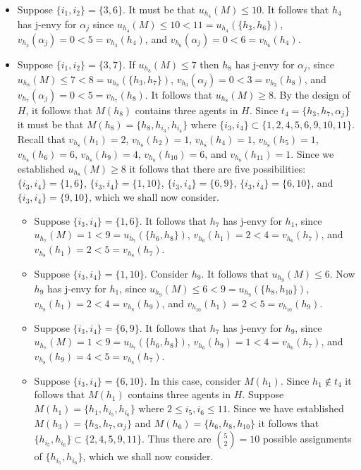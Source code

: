 \begin{itemize}
\begin{itemize}
\end{itemize}
\item Suppose $\{ {i_1}, {i_2} \} = \{ 3, 6 \}$. It must be that $u_{h_4}(M) \leq 10$. It follows that $h_4$ has j-envy for $\alpha_{j}$ since $u_{h_4}(M) \leq 10 < 11 = u_{h_4}(\{ h_3, h_6 \})$, $v_{h_3}(\alpha_{j}) = 0 < 5 = v_{h_3}(h_4)$, and $v_{h_6}(\alpha_{j}) = 0 < 6 = v_{h_6}(h_4)$.
\item Suppose $\{ {i_1}, {i_2} \} = \{ 3, 7 \}$. If $u_{h_8}(M) \leq 7$ then $h_8$ has j-envy for $\alpha_{j}$, since $u_{h_8}(M) \leq 7 < 8 = u_{h_8}(\{ h_3, h_7 \})$, $v_{h_3}(\alpha_{j}) = 0 < 3 = v_{h_3}(h_8)$, and $v_{h_7}(\alpha_{j}) = 0 < 5 = v_{h_7}(h_8)$. It follows that $u_{h_8}(M) \geq 8$. By the design of $H$, it follows that $M(h_8)$ contains three agents in $H$. Since $t_4 = \{ h_3, h_7, \alpha_{j} \}$ it must be that $M(h_8) = \{ h_8, h_{i_3}, h_{i_4} \}$ where $\{ i_3, i_4 \} \subset \{ 1, 2, 4, 5, 6, 9, 10, 11 \}$. Recall that $v_{h_8}(h_1) = 2$, $v_{h_8}(h_2) = 1$, $v_{h_8}(h_4) = 1$, $v_{h_8}(h_5) = 1$, $v_{h_8}(h_6) = 6$, $v_{h_8}(h_9) = 4$, $v_{h_8}(h_{10}) = 6$, and $v_{h_8}(h_{11}) = 1$. Since we established $u_{h_8}(M) \geq 8$ it follows that there are five possibilities: $\{ {i_3}, {i_4} \} = \{ 1, 6 \}$, $\{ {i_3}, {i_4} \} = \{ 1, 10 \}$, $\{ {i_3}, {i_4} \} = \{ 6, 9 \}$, $\{ {i_3}, {i_4} \} = \{ 6, 10 \}$, and $\{ {i_3}, {i_4} \} = \{ 9, 10 \}$, which we shall now consider.
\begin{itemize}
    \item Suppose $\{ {i_3}, {i_4} \} = \{ 1, 6 \}$. It follows that $h_7$ has j-envy for $h_1$, since $u_{h_7}(M) = 1 < 9 = u_{h_7}(\{ h_6, h_8 \})$, $v_{h_6}(h_1) = 2 < 4 = v_{h_6}(h_7)$, and $v_{h_8}(h_1) = 2 < 5 = v_{h_8}(h_7)$.
    \item Suppose $\{ {i_3}, {i_4} \} = \{ 1, 10 \}$. Consider $h_9$. It follows that $u_{h_9}(M) \leq 6$. Now $h_9$ has j-envy for $h_1$, since $u_{h_9}(M) \leq 6 < 9 = u_{h_9}(\{ h_8, h_{10} \})$, $v_{h_8}(h_1) = 2 < 4 = v_{h_8}(h_9)$, and $v_{h_{10}}(h_1) = 2 < 5 = v_{h_{10}}(h_9)$.
    \item Suppose $\{ {i_3}, {i_4} \} = \{ 6, 9 \}$. It follows that $h_7$ has j-envy for $h_9$, since $u_{h_7}(M) = 1 < 9 = u_{h_7}(\{ h_6, h_8 \})$, $v_{h_6}(h_9) = 1 < 4 = v_{h_6}(h_7)$, and $v_{h_8}(h_9) = 4 < 5 = v_{h_8}(h_7)$.
    \item Suppose $\{ {i_3}, {i_4} \} = \{ 6, 10 \}$. In this case, consider $M(h_1)$. Since $h_1 \notin t_4$ it follows that $M(h_1)$ contains three agents in $H$. Suppose $M(h_1) = \{ h_1, h_{i_5}, h_{i_6} \}$ where $2 \leq i_5, i_6 \leq 11$. Since we have established $M(h_3) = \{ h_3, h_7, \alpha_{j} \}$ and $M(h_6) = \{ h_6, h_8, h_{10} \}$ it follows that $\{ h_{i_5}, h_{i_6} \} \subset \{ 2, 4, 5, 9, 11 \}$. Thus there are $\binom{5}{2}=10$ possible assignments of $\{ h_{i_5}, h_{i_6} \}$, which we shall now consider.

\end{itemize}
\end{itemize}
